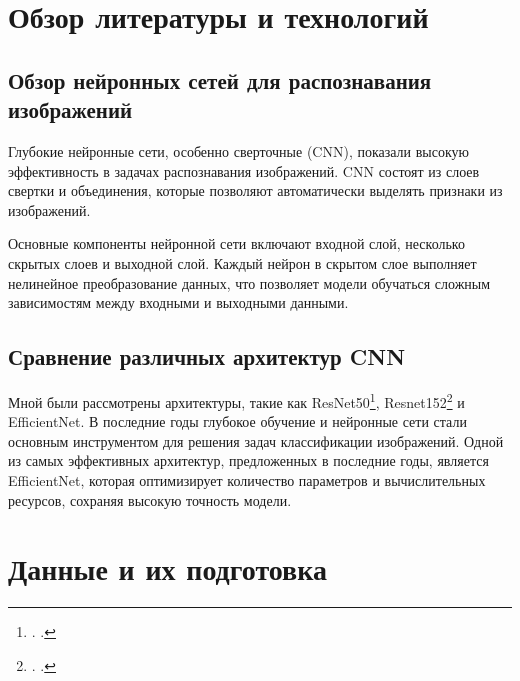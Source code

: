 \documentclass[14pt]{extarticle}
\begin{document}
\section{Обзор литературы и технологий}
\setlength{\parindent}{1cm} 
\subsection{Обзор нейронных сетей для распознавания изображений}
\hspace{1cm}Глубокие нейронные сети, особенно сверточные (CNN), показали высокую эффективность в задачах распознавания изображений. CNN состоят из слоев свертки и объединения, которые позволяют автоматически выделять признаки из изображений. 

Основные компоненты нейронной сети включают входной слой, несколько скрытых слоев и выходной слой. Каждый нейрон в скрытом слое выполняет нелинейное преобразование данных, что позволяет модели обучаться сложным зависимостям между входными и выходными данными.

\subsection{Сравнение различных архитектур CNN}
\hspace{1cm}Мной были рассмотрены архитектуры, такие как ResNet50\footnote{\citeauthor{resnet50hub}. \emph{}.}, Resnet152\footnote{\citeauthor{resnet152}. \emph{}.} и EfficientNet. В последние годы глубокое обучение и нейронные сети стали основным инструментом для решения задач классификации изображений. Одной из самых эффективных архитектур, предложенных в последние годы, является EfficientNet, которая оптимизирует количество параметров и вычислительных ресурсов, сохраняя высокую точность модели. 

\section{Данные и их подготовка}
\end{document}
